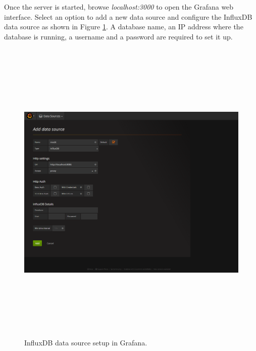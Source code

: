Once the server is started, browse \textit{localhost:3000} to open the Grafana web interface. Select an option to add a new data source and configure the InfluxDB data source as shown in Figure \ref{fig:gr_db_setup}. A database name, an IP address where the database is running, a username and a password are required to set it up.

\begin{figure}[htpb]
	\centering
	\includegraphics[width=16cm,height=15cm,keepaspectratio=true]{images/gr_db_setup}
	\caption{
		InfluxDB data source setup in Grafana.
	}
	\label{fig:gr_db_setup}
\end{figure}



